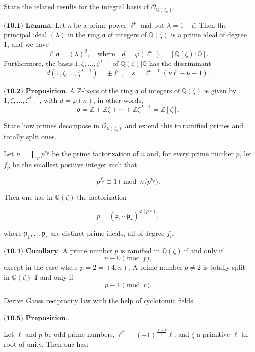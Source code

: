 State the related results for the integral basis of \( \mathcal{O}_{\mathbb{Q}(\zeta_n)} \).

\( \textbf{(10.1) Lemma.} \) 
Let \( n \) be a prime power \(\ell^\nu\) and put \(\lambda = 1 - \zeta\). 
Then the principal ideal \((\lambda)\) in the ring \(\mathfrak{o}\) of integers of \(\mathbb{Q}(\zeta)\) is a prime ideal of degree 1, and we have
\[
\ell \, \mathfrak{o} = (\lambda)^d, \quad \text{where} \quad d = \varphi(\ell^\nu) = [\mathbb{Q}(\zeta) : \mathbb{Q}].
\]
Furthermore, the basis \(1, \zeta, \ldots, \zeta^{d-1}\) of \(\mathbb{Q}(\zeta)|\mathbb{Q}\) has the discriminant
\[
d(1, \zeta, \ldots, \zeta^{d-1}) = \pm \ell^s, \quad s = \ell^{\nu-1}(\nu \ell - \nu - 1).
\]

\( \textbf{(10.2) Proposition.} \) 
A \(\mathbb{Z}\)-basis of the ring \(\mathfrak{o}\) of integers of \(\mathbb{Q}(\zeta)\) is given by \(1, \zeta, \ldots, \zeta^{d-1}\), 
with \(d = \varphi(n)\), in other words,
\[
\mathfrak{o} = \mathbb{Z} + \mathbb{Z}\zeta + \cdots + \mathbb{Z}\zeta^{d-1} = \mathbb{Z}[\zeta].
\]


State how primes decompose in \( \mathcal{O}_{\mathbb{Q}(\zeta_n)} \) and extend this to ramified primes
and totally split ones.

Let \( n = \prod_p p^{\nu_p} \) be the prime factorization of \( n \) and, for every prime number \( p \), 
let \( f_p \) be the smallest positive integer such that

\[
p^{f_p} \equiv 1 \pmod{n/p^{\nu_p}}.
\]

Then one has in \(\mathbb{Q}(\zeta)\) the factorization

\[
p = (\mathfrak{p}_1 \cdots \mathfrak{p}_r)^{\varphi(p^{\nu_p})},
\]

where \(\mathfrak{p}_1, \ldots, \mathfrak{p}_r\) are distinct prime ideals, all of degree \( f_p \).

\( \textbf{(10.4) Corollary.} \) 
A prime number \( p \) is ramified in \(\mathbb{Q}(\zeta)\) if and only if
\[
n \equiv 0 \pmod{p},
\]
except in the case where \( p = 2 = (4, n) \). A prime number \( p \neq 2 \) is totally split in \(\mathbb{Q}(\zeta)\) if and only if
\[
p \equiv 1 \pmod{n}.
\]



Derive Gauss reciprocity law with the help of cyclotomic fields

\( \textbf{(10.5) Proposition.} \). 

Let \(\ell\) and \(p\) be odd prime numbers, \(\ell^* = (-1)^{\frac{\ell-1}{2}} \ell\), 
and \(\zeta\) a primitive \(\ell\)-th root of unity. Then one has:


